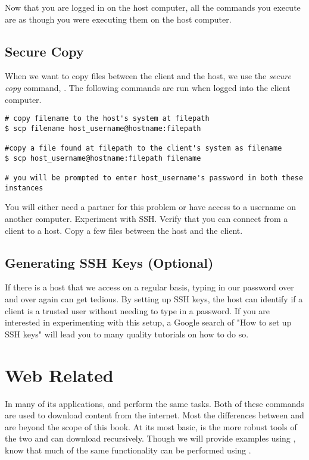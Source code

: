 Now that you are logged in on the host computer, all the commands you execute are as though you were executing them on the host computer.

\subsection*{Secure Copy}

When we want to copy files between the client and the host, we use the \emph{secure copy} command, . The following commands are run when logged into the client computer.

\begin{lstlisting}
# copy filename to the host's system at filepath
$ scp filename host_username@hostname:filepath

#copy a file found at filepath to the client's system as filename
$ scp host_username@hostname:filepath filename

# you will be prompted to enter host_username's password in both these instances 
\end{lstlisting}

\begin{problem}
You will either need a partner for this problem or have access to a username on another computer. Experiment with SSH. Verify that you can connect from a client to a host. Copy a few files between the host and the client.
\end{problem}

\subsection*{Generating SSH Keys (Optional)}
If there is a host that we access on a regular basis, typing in our password over and over again can get tedious. By setting up SSH keys, the host can identify if a client is a trusted user without needing to type in a password. If you are interested in experimenting with this setup, a Google search of "How to set up SSH keys" will lead you to many quality tutorials on how to do so.

\section*{Web Related}

In many of its applications,  and  perform the same tasks. Both of these commands are used to download content from the internet. Most the differences between  and  are beyond the scope of this book. 
At its most basic,  is the more robust tools of the two and  can download recursively. Though we will provide examples using , know that much of the same functionality can be performed using .

